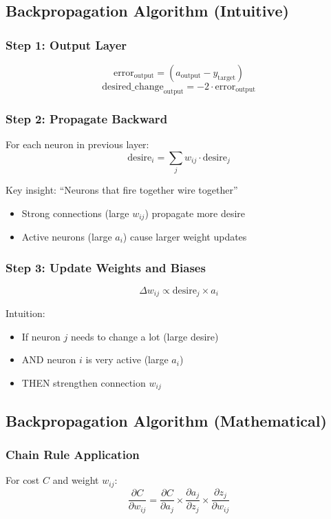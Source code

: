 \documentclass[11pt,a4paper]{article}
\begin{document}
\subsection{Backpropagation Algorithm (Intuitive)}

\subsubsection{Step 1: Output Layer}
\[
\text{error}_{\text{output}} = (a_{\text{output}} - y_{\text{target}})
\]
\[
\text{desired\_change}_{\text{output}} = -2 \cdot \text{error}_{\text{output}}
\]

\subsubsection{Step 2: Propagate Backward}
For each neuron in previous layer:
\[
\text{desire}_i = \sum_j w_{ij} \cdot \text{desire}_j
\]

Key insight: ``Neurons that fire together wire together''
\begin{itemize}
    \item Strong connections (large $w_{ij}$) propagate more desire
    \item Active neurons (large $a_i$) cause larger weight updates
\end{itemize}

\subsubsection{Step 3: Update Weights and Biases}
\[
\Delta w_{ij} \propto \text{desire}_j \times a_i
\]

Intuition:
\begin{itemize}
    \item If neuron $j$ needs to change a lot (large desire)
    \item AND neuron $i$ is very active (large $a_i$)
    \item THEN strengthen connection $w_{ij}$
\end{itemize}

\subsection{Backpropagation Algorithm (Mathematical)}

\subsubsection{Chain Rule Application}
For cost $C$ and weight $w_{ij}$:
\[
\frac{\partial C}{\partial w_{ij}} = \frac{\partial C}{\partial a_j} \times \frac{\partial a_j}{\partial z_j} \times \frac{\partial z_j}{\partial w_{ij}}
\]
\end{document}
